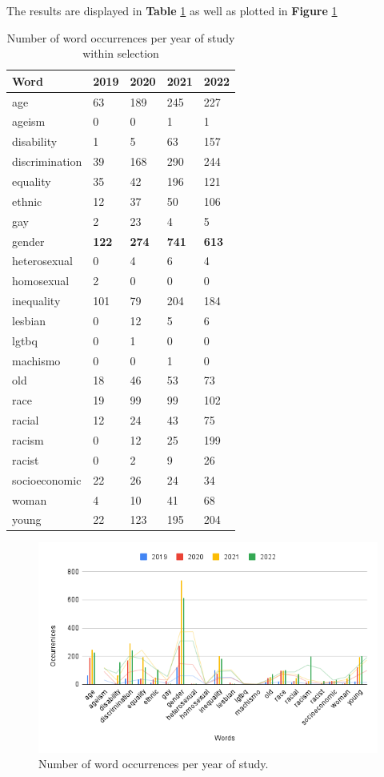 \documentclass[runningheads]{llncs}
\begin{document}
The results are displayed in \textbf{Table}\textit{} \ref{tab3} as well as plotted in \textbf{Figure}\textit{} \ref{chart}
\begin{table}
\caption{Number of word occurrences per year of study within selection}\label{tab3}
\centering
\begin{tabular}{|l|l|l|l|l|}
\hline
Word &  2019 & 2020 & 2021 & 2022\\
\hline
age & 63 & 189 & 245 & 227 \\
ageism & 0 & 0 & 1 & 1 \\
disability & 1 & 5 & 63 & 157 \\
discrimination & 39 & 168 & 290 & 244 \\
equality & 35 & 42 & 196 & 121 \\ 
ethnic & 12 & 37 & 50 & 106 \\
gay & 2 & 23 & 4 & 5 \\
gender &\textbf{122} &\textbf{274} &\textbf{741} &\textbf{613} \\
heterosexual &0 &4 &6 &4 \\
homosexual &2 &0 &0 &0 \\
inequality &101 &79 &204 &184 \\
lesbian &0 &12 &5 &6 \\
lgtbq &0 &1 &0 &0 \\
machismo &0 &0 &1 &0 \\old &18 &46 &53 &73 \\
race &19 &99 &99 &102 \\
racial &12 &24 &43 &75 \\
racism &0 &12 &25 &199 \\
racist &0 &2 &9 &26 \\
socioeconomic &22 &26 &24 &34 \\
woman &4 &10 &41 &68 \\
young &22 &123 &195 &204 \\
\hline
\end{tabular}
\end{table}
\begin{figure}
\includegraphics[width=\textwidth]{chart.png}
\centering
\caption{Number of word occurrences per year of study.} \label{chart}
\end{figure}
\end{document}
